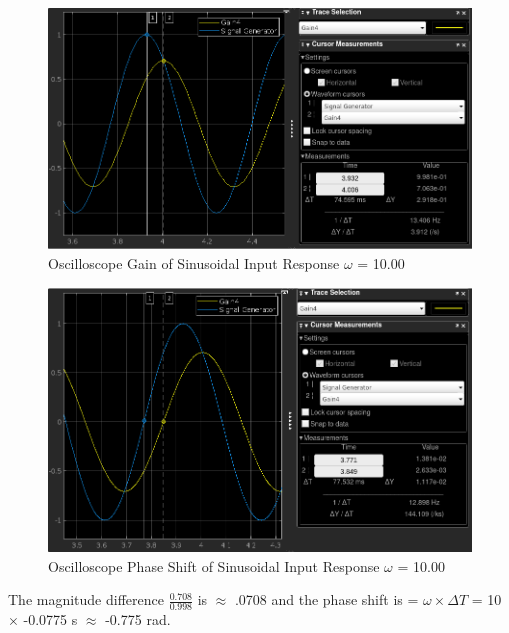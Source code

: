 \documentclass[12pt]{article}
\begin{document}
			\begin{figure}[H]
				\centering
				\includegraphics[width=1\linewidth]{"Code/Fig/w_10_mag.png"} 
				\caption{Oscilloscope Gain of Sinusoidal Input Response $\omega$ = 10.00}
				\label{fig:slx_sine_input_output_w_10_mag}
			\end{figure}
			\begin{figure}[H]
				\centering
				\includegraphics[width=1\linewidth]{"Code/Fig/w_10_ang.png"} 
				\caption{Oscilloscope Phase Shift of Sinusoidal Input Response $\omega$ = 10.00}
				\label{fig:slx_sine_input_output_w_10_ang}
			\end{figure}		
			The magnitude difference $\frac{0.708}{0.998}$ is $\approx$ .0708 and the phase shift is = $\omega \times \Delta T$ = 10 $\times$ -0.0775 s  $\approx$ -0.775 rad.
\end{document}
